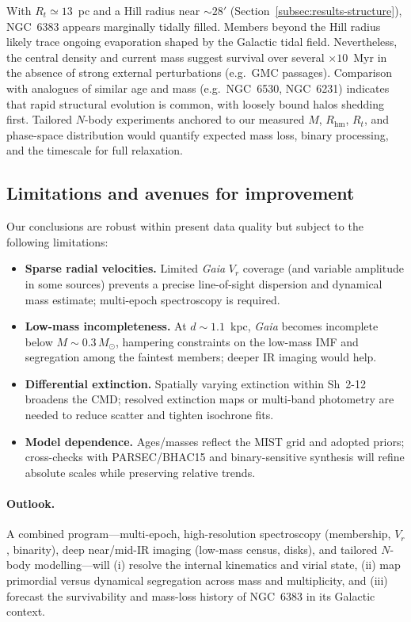 \documentclass[../main.tex]{subfiles}
\begin{document}
With $R_t\simeq13$~pc and a Hill radius near $\sim28'$ (Section~\ref{subsec:results-structure}), NGC~6383 appears marginally tidally filled. Members beyond the Hill radius likely trace ongoing evaporation shaped by the Galactic tidal field. Nevertheless, the central density and current mass suggest survival over several $\times10$~Myr in the absence of strong external perturbations (e.g.\ GMC passages). Comparison with analogues of similar age and mass (e.g.\ NGC~6530, NGC~6231) indicates that rapid structural evolution is common, with loosely bound halos shedding first. Tailored $N$-body experiments anchored to our measured $M$, $R_{\text{hm}}$, $R_t$, and phase-space distribution would quantify expected mass loss, binary processing, and the timescale for full relaxation.

\subsection{Limitations and avenues for improvement}
\label{subsec:discussion-limitations}

Our conclusions are robust within present data quality but subject to the following limitations:

\begin{itemize}
  \item \textbf{Sparse radial velocities.} Limited \textit{Gaia} $V_r$ coverage (and variable amplitude in some sources) prevents a precise line-of-sight dispersion and dynamical mass estimate; multi-epoch spectroscopy is required.
  \item \textbf{Low-mass incompleteness.} At $d\!\sim\!1.1$~kpc, \textit{Gaia} becomes incomplete below $M\!\sim\!0.3\,M_\odot$, hampering constraints on the low-mass IMF and segregation among the faintest members; deeper IR imaging would help.
  \item \textbf{Differential extinction.} Spatially varying extinction within Sh~2-12 broadens the CMD; resolved extinction maps or multi-band photometry are needed to reduce scatter and tighten isochrone fits.
  \item \textbf{Model dependence.} Ages/masses reflect the MIST grid and adopted priors; cross-checks with PARSEC/BHAC15 and binary-sensitive synthesis will refine absolute scales while preserving relative trends.
\end{itemize}

\paragraph{Outlook.} A combined program—multi-epoch, high-resolution spectroscopy (membership, $V_r$, binarity), deep near/mid-IR imaging (low-mass census, disks), and tailored $N$-body modelling—will (i) resolve the internal kinematics and virial state, (ii) map primordial versus dynamical segregation across mass and multiplicity, and (iii) forecast the survivability and mass-loss history of NGC~6383 in its Galactic context.

\biblio
\end{document}
